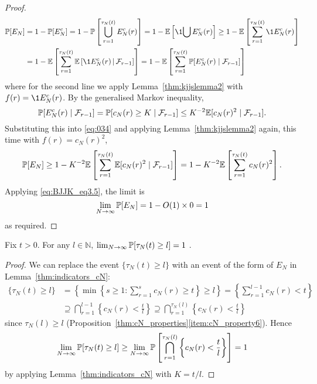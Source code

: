 \begin{proof}
\begin{align}
\Prob[E_N]
&= 1- \Prob[E_N^c]
= 1- \Prob\left[ \bigcup_{r=1}^{\tau_N(t)} E_N^c(r) \right]
= 1- \E\left[ \1{\bigcup E_N^c(r)} \right]
\geq 1 - \E\left[ \sum_{r=1}^{\tau_N(t)} \1{E_N^c(r)} \right] \notag\\
&= 1- \E\left[  \sum_{r=1}^{\tau_N(t)} \E\left[ \1{E_N^c(r)} 
        \midd \mathcal{F}_{r-1} \right] \right]
= 1- \E\left[  \sum_{r=1}^{\tau_N(t)} \Prob[ E_N^c(r)
        \mid \mathcal{F}_{r-1} ] \right] \label{eq:034}
\end{align}
where for the second line we apply Lemma~\ref{thm:kjjslemma2} with $f(r) = \1{E_N^c(r)} $.
By the generalised Markov inequality,
\begin{equation*}
\mathbb{P}[ E_N^c(r) \mid \mathcal{F}_{r-1} ]
= \mathbb{P}[ c_N(r) \geq K \mid \mathcal{F}_{r-1} ]
\leq K^{-2} \mathbb{E}[c_N(r)^2 \mid \mathcal{F}_{r-1} ] .
\end{equation*}
Substituting this into \eqref{eq:034} and applying Lemma~\ref{thm:kjjslemma2} again, this time with $f(r) = c_N(r)^2$,
\begin{equation*}
\mathbb{P}[E_N]
\geq 1- K^{-2} \mathbb{E}\left[  \sum_{r=1}^{\tau_N(t)} 
        \mathbb{E}[c_N(r)^2 \mid \mathcal{F}_{r-1} ] \right]
= 1 - K^{-2} \mathbb{E}\left[  \sum_{r=1}^{\tau_N(t)} c_N(r)^2 \right] .
\end{equation*}
Applying \eqref{eq:BJJK_eq3.5}, the limit is
\begin{equation*}
\lim_{N\to\infty} \mathbb{P}[E_N]
= 1 - O(1) \times 0
=1 
\end{equation*}
as required.
\end{proof}


\begin{lemma}\label{thm:indicators_tau}
Fix $t>0$. For any $l \in \mathbb{N}$,
$\lim_{N\to\infty} \mathbb{P}[ \tau_N(t) \geq l ] =1$ .
\end{lemma}

\begin{proof}
We can replace the event $\{ \tau_N(t) \geq l \}$ with an event of the form of $E_N$ in Lemma~\ref{thm:indicators_cN}:
\begin{align*}
\{ \tau_N(t) \geq l \} 
&= \left\{ \min \left\{ s \geq 1 : \sum_{r=1}^{s} c_N(r) \geq t \right\} \geq l \right\}
= \left\{ \sum_{r=1}^{l-1} c_N(r) < t \right\} \\
&\supseteq \bigcap_{r=1}^{l-1} \left \{ c_N(r) < \frac{t}{l} \right\}
\supseteq \bigcap_{r=1}^{\tau_N(l)} \left \{ c_N(r) < \frac{t}{l} \right\} 
\end{align*}
since $\tau_N(l) \geq l$ (Proposition~\ref{thm:cN_properties}\ref{item:cN_property6}).
Hence
\begin{equation*}
\lim_{N\to\infty} \mathbb{P}[ \tau_N(t) \geq l ] 
\geq \lim_{N\to\infty} \mathbb{P}\left[ \bigcap_{r=1}^{\tau_N(l)} 
        \left \{ c_N(r) < \frac{t}{l} \right\} \right]
=1
\end{equation*}
by applying Lemma~\ref{thm:indicators_cN} with $K=t/l$.
\end{proof}



